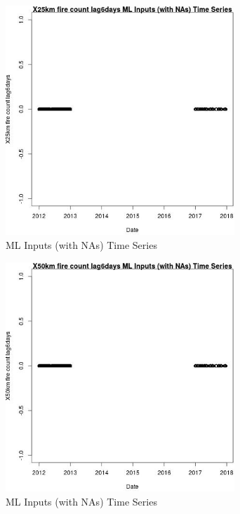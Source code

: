 \begin{figure} 
\centering  
\includegraphics[width=0.77\textwidth]{Code_Outputs/Report_ML_input_PM25_Step4_part_e_de_duplicated_aves_compiled_2019-05-14wNAs_X25km_fire_count_lag6daysvDate.jpg} 
\caption{\label{fig:Report_ML_input_PM25_Step4_part_e_de_duplicated_aves_compiled_2019-05-14wNAsX25km_fire_count_lag6daysvDate}ML Inputs (with NAs) Time Series} 
\end{figure} 
 

\begin{figure} 
\centering  
\includegraphics[width=0.77\textwidth]{Code_Outputs/Report_ML_input_PM25_Step4_part_e_de_duplicated_aves_compiled_2019-05-14wNAs_X50km_fire_count_lag6daysvDate.jpg} 
\caption{\label{fig:Report_ML_input_PM25_Step4_part_e_de_duplicated_aves_compiled_2019-05-14wNAsX50km_fire_count_lag6daysvDate}ML Inputs (with NAs) Time Series} 
\end{figure} 
 

